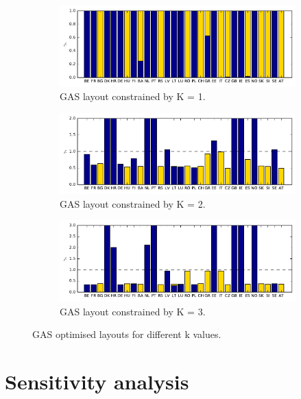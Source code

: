 \documentclass[a4paper, 5p, sort&compress]{elsarticle}%
\newcommand{\chromowidth}{1.00 \columnwidth}
\begin{document}
\begin{figure}[p!]
  \centering
  \begin{subfigure}{2\columnwidth}
    \includegraphics[width = \chromowidth, center]{chromosome_k=1gas}
    \caption{GAS layout constrained by K = 1.}
    \label{fig:betaOpt}
  \end{subfigure}
  \begin{subfigure}{2\columnwidth}
    \includegraphics[width = \chromowidth, center]{chromosome_k=2gas}
    \caption{GAS layout constrained by K = 2.}
    \label{fig:cfMaxOpt}
  \end{subfigure}
  \begin{subfigure}{2\columnwidth}
    \includegraphics[width = \chromowidth, center]{chromosome_k=3gas}
    \caption{GAS layout constrained by K = 3.}
    \label{fig:agdOpt}
  \end{subfigure}
  \caption{GAS optimised layouts for different k values.}
  \label{fig:optLayouts}
\end{figure}

\section{Sensitivity analysis}
\label{sec:sensitivity-analysis}
\end{document}
